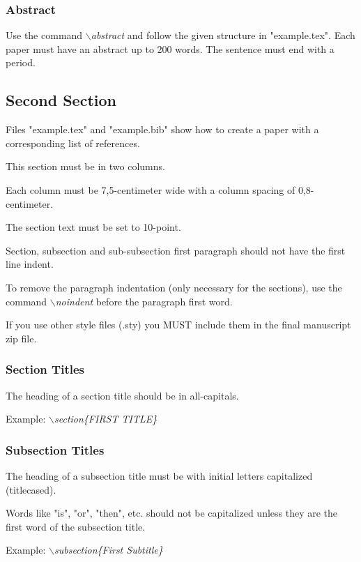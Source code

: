 \documentclass[a4paper,twoside]{article}
\begin{document}
\subsubsection{Abstract}

Use the command \textit{$\backslash$abstract} and follow the given structure in "example.tex".
Each paper must have an abstract up to 200 words. The sentence
must end with a period.

\subsection{Second Section}

Files "example.tex" and "example.bib" show how to create a paper
with a corresponding list of references.

This section must be in two columns.

Each column must be 7,5-centimeter wide with a column spacing
of 0,8-centimeter.

The section text must be set to 10-point.

Section, subsection and sub-subsection first paragraph should not
have the first line indent.

To remove the paragraph indentation (only necessary for the
sections), use the command \textit{$\backslash$noindent} before the
paragraph first word.

If you use other style files (.sty) you MUST include them in the
final manuscript zip file.


\subsubsection{Section Titles}

The heading of a section title should be in all-capitals.

Example: \textit{$\backslash$section\{FIRST TITLE\}}

\subsubsection{Subsection Titles}

The heading of a subsection title must be with initial letters
capitalized (titlecased).

Words like "is", "or", "then", etc. should not be capitalized unless
they are the first word of the subsection title.

Example: \textit{$\backslash$subsection\{First Subtitle\}}
\end{document}
